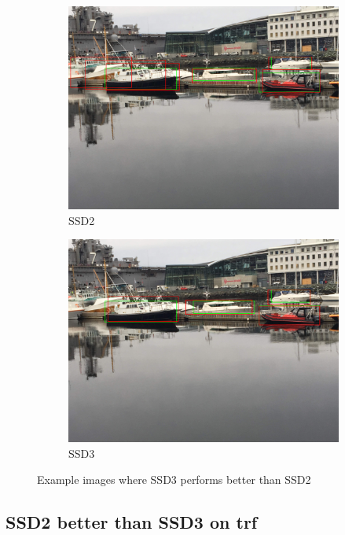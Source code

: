 \begin{figure}[h!]
\begin{subfigure}{.5\textwidth}
  \centering
  \includegraphics[width=0.8\linewidth]{results/case_buildings/ssdtrf/ssd2/3better/IMG_2728.jpg}
  \caption{SSD2}
\end{subfigure}%
\begin{subfigure}{.5\textwidth}
  \centering
  \includegraphics[width=.8\linewidth]{results/case_buildings/ssdtrf/ssd3/3better/IMG_2728.jpg}
  \caption{SSD3}
\end{subfigure}
\caption{Example images where SSD3 performs better than SSD2}
\label{img:ssd_trf_3better}
\end{figure}

\newpage

\subsection{SSD2 better than SSD3 on trf}
\label{sec_ssd2_better_trf}

